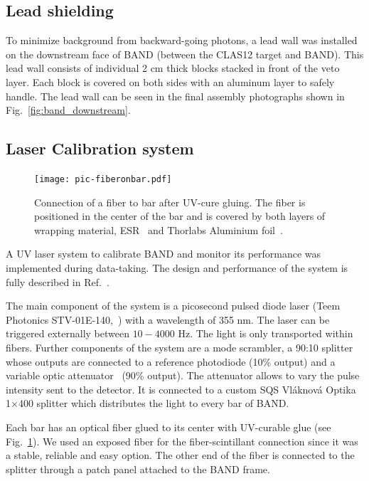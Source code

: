 \documentclass[3p,twocolumn]{elsarticle}
\begin{document}
\subsection{Lead shielding}
To minimize background from backward-going photons, a
lead wall was installed on the downstream face of BAND (between the CLAS12 target
and BAND). This lead wall consists of individual 2 \si{\centi\meter}
thick blocks stacked in front of the veto layer. Each block is covered
on both sides with an aluminum layer to safely handle. The
lead wall can be seen in the final assembly photographs shown in
Fig.~\ref{fig:band_downstream}.


\subsection{Laser Calibration system}
\label{sec:laserystem}
\begin{figure}[tb]
	\centering
		\texttt{[image: pic-fiberonbar.pdf]}
	\caption{Connection of a fiber to bar after UV-cure gluing. The fiber is positioned in the center of the bar and is covered by both layers of wrapping material, ESR~\cite{3MESR} and Thorlabs Aluminium foil~\cite{thorlabsfoil}.}
	\label{fig:pic-fiberonbar}
\end{figure} 
A UV laser system to calibrate BAND and monitor its
performance was implemented during data-taking. 
The design and performance of the system is fully 
described in Ref.~\cite{band-laser}. 

The main component of the system is a picosecond pulsed diode laser 
(Teem Photonics STV-01E-140,~\cite{teem_laser}) with a wavelength 
of 355 \si{\nano\meter}. The laser can be triggered externally between 
$10-4000$ \si{\hertz}. The light is only transported within fibers. Further components of the system are a mode scrambler, a 90:10 splitter whose outputs are connected to a reference photodiode (10\% output) and a variable optic attenuator~\cite{attenuator} (90\% output). The attenuator allows to vary the pulse intensity sent to the detector. It is connected to a custom SQS Vl\'aknov\'a Optika 1$\times$400 splitter which distributes the light to every bar of BAND. 

Each bar has an optical fiber glued to its center with UV-curable glue (see
Fig.~\ref{fig:pic-fiberonbar}). We used an exposed fiber for the fiber-scintillant connection since it was a stable, reliable and easy option. The other end of the fiber is connected to the splitter through a patch panel attached to the BAND frame. 
\end{document}

